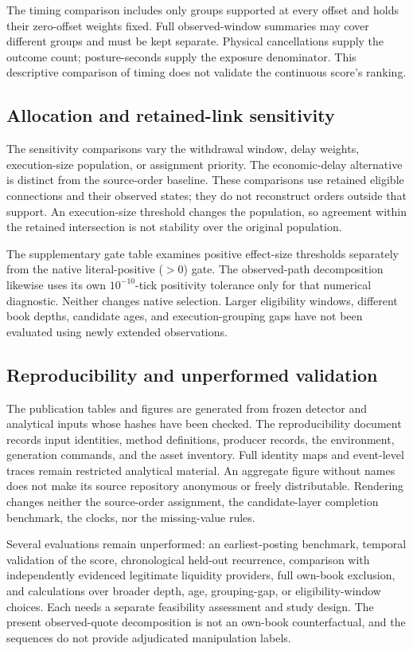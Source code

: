 \documentclass[11pt]{article}
\begin{document}
The timing comparison includes only groups supported at every offset and holds their zero-offset weights fixed. Full observed-window summaries may cover different groups and must be kept separate. Physical cancellations supply the outcome count; posture-seconds supply the exposure denominator. This descriptive comparison of timing does not validate the continuous score's ranking.

\subsection{Allocation and retained-link sensitivity}
The sensitivity comparisons vary the withdrawal window, delay weights, execution-size population, or assignment priority. The economic-delay alternative is distinct from the source-order baseline. These comparisons use retained eligible connections and their observed states; they do not reconstruct orders outside that support. An execution-size threshold changes the population, so agreement within the retained intersection is not stability over the original population.




\FloatBarrier

The supplementary gate table examines positive effect-size thresholds separately from the native literal-positive ($>0$) gate. The observed-path decomposition likewise uses its own $10^{-10}$-tick positivity tolerance only for that numerical diagnostic. Neither changes native selection. Larger eligibility windows, different book depths, candidate ages, and execution-grouping gaps have not been evaluated using newly extended observations.

\subsection{Reproducibility and unperformed validation}
The publication tables and figures are generated from frozen detector and analytical inputs whose hashes have been checked. The reproducibility document records input identities, method definitions, producer records, the environment, generation commands, and the asset inventory. Full identity maps and event-level traces remain restricted analytical material. An aggregate figure without names does not make its source repository anonymous or freely distributable. Rendering changes neither the source-order assignment, the candidate-layer completion benchmark, the clocks, nor the missing-value rules.

Several evaluations remain unperformed: an earliest-posting benchmark, temporal validation of the score, chronological held-out recurrence, comparison with independently evidenced legitimate liquidity providers, full own-book exclusion, and calculations over broader depth, age, grouping-gap, or eligibility-window choices. Each needs a separate feasibility assessment and study design. The present observed-quote decomposition is not an own-book counterfactual, and the sequences do not provide adjudicated manipulation labels.



\end{document}
